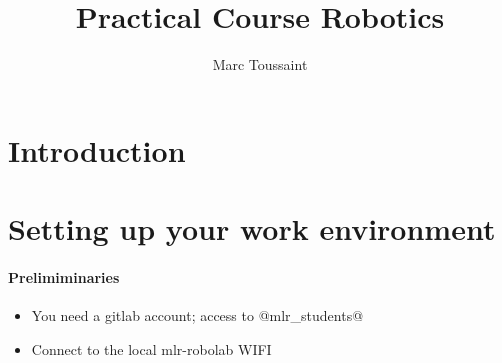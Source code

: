 \documentclass[10pt,fleqn,twoside]{article}
\title{Practical Course Robotics}
\author{Marc Toussaint}
\begin{document}
\maketitle

{\small\tableofcontents }

\section{Introduction}

\section{Setting up your work environment}

\paragraph{Prelimiminaries}
\begin{itemize}
\item You need a gitlab account; access to @mlr_students@
\item Connect to the local mlr-robolab WIFI
\end{itemize}
\end{document}
